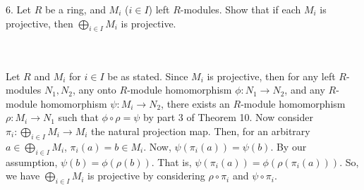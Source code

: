 6. Let $R$ be a ring, and $M_i$ ($i\in I$) left $R$-modules. Show that if each $M_i$ is projective,
then $\bigoplus_{i\in I} M_i$ is projective.\\\\

\begin{solution}\renewcommand{\qedsymbol}{}\ \\
    Let $R$ and $M_i$ for $i\in I$ be as stated. Since $M_i$ is projective, then for any left
    $R$-modules $N_1, N_2$, any onto $R$-module homomorphism $\phi:N_1\rightarrow N_2$, and any
    $R$-module homomorphism $\psi:M_i\rightarrow N_2$, there exists an $R$-module homomorphism
    $\rho:M_i\rightarrow N_1$ such that $\phi\circ\rho=\psi$ by part 3 of Theorem 10. Now consider
    $\pi_i:\bigoplus_{i\in I}M_i\rightarrow M_i$ the natural projection map. Then, for an arbitrary
    $a\in\bigoplus_{i\in I}M_i$, $\pi_i(a)=b\in M_i$. Now, $\psi(\pi_i(a))=\psi(b)$. By our assumption,
    $\psi(b)=\phi(\rho(b))$. That is, $\psi(\pi_i(a))=\phi(\rho(\pi_i(a)))$. So, we have
    $\bigoplus_{i\in I}M_i$ is projective by considering $\rho\circ\pi_i$ and $\psi\circ\pi_i$.

\end{solution}